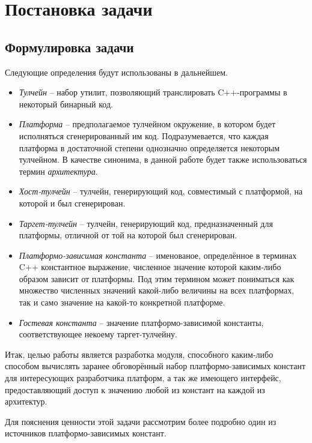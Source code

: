 \chapter{Постановка задачи}
\label{sec:Chapter1} 

\section{Формулировка задачи}

Следующие определения будут использованы в дальнейшем.

\begin{itemize}
    \item
        \textit{Тулчейн} -- набор утилит, позволяющий транслировать C++-программы в некоторый бинарный код.
    \item
        \textit{Платформа} -- предполагаемое тулчейном окружение, в котором будет исполняться сгенерированный им код. Подразумевается, что каждая платформа в достаточной степени однозначно определяется некоторым тулчейном. В качестве синонима, в данной работе будет также использоваться термин \textit{архитектура}.
    \item
        \textit{Хост-тулчейн} -- тулчейн, генерирующий код, совместимый с платформой, на которой и был сгенерирован.
    \item
        \textit{Таргет-тулчейн} -- тулчейн, генерирующий код, предназначенный для платформы, отличной от той на которой был сгенерирован.
    \item
        \textit{Платформо-зависимая константа} -- именованое, определённое в терминах C++ константное выражение, численное значение которой каким-либо образом зависит от платформы. Под этим термином может пониматься как множество численных значений какой-либо величины на всех платформах, так и само значение на какой-то конкретной платформе.
    \item
        \textit{Гостевая константа} -- значение платформо-зависимой константы, соответствующее некоему таргет-тулчейну.

\end{itemize}

Итак, целью работы является разработка модуля, способного каким-либо способом вычислять заранее обговорённый набор платформо-зависимых констант для интересующих разработчика платформ, а так же имеющего интерфейс, предоставляющий доступ к значению любой из констант на каждой из архитектур.
\par
Для пояснения ценности этой задачи рассмотрим более подробно один из источников платформо-зависимых констант.

